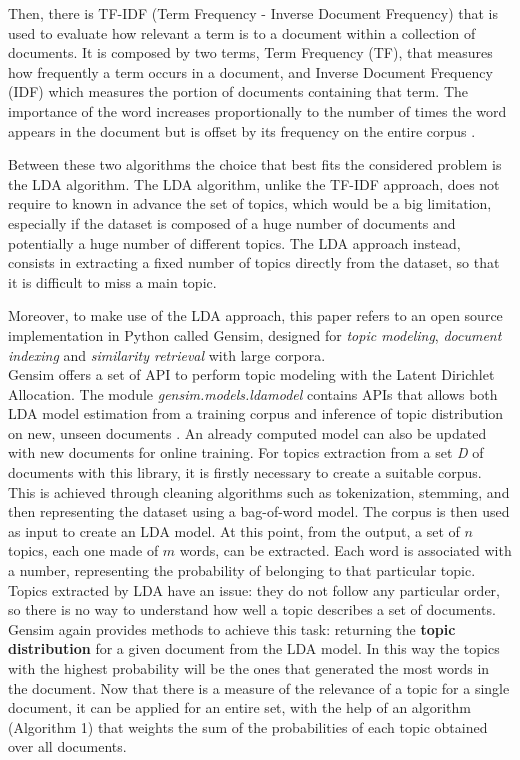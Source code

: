 Then, there is TF-IDF (Term Frequency - Inverse Document Frequency) that is used to evaluate how relevant a term is to a document within a collection of documents. It is composed by two terms, Term Frequency (TF), that measures how frequently a term occurs in a document, and Inverse Document Frequency (IDF) which measures the portion of documents containing that term. The importance of the word increases proportionally to the number of times the word appears in the document but is offset by its frequency on the entire corpus \cite{TFIDF}.



Between these two algorithms the choice that best fits the considered problem is the LDA algorithm. The LDA algorithm, unlike the TF-IDF approach, does not require to known in advance the set of topics, which would be a big limitation, especially if the dataset is composed of a huge number of documents and potentially a huge number of different topics. The LDA approach instead, consists in extracting a fixed number of topics directly from the dataset, so that it is difficult to miss a main topic.

Moreover, to make use of the LDA approach, this paper refers to an open source implementation in Python called Gensim, designed for \emph{topic modeling}, \emph{document indexing} and \emph{similarity retrieval} with large corpora.\\

Gensim offers a set of API to perform topic modeling with the Latent Dirichlet Allocation. The module \emph{gensim.models.ldamodel} contains APIs that allows both LDA model estimation from a training corpus and inference of topic distribution on new, unseen documents \cite{gensim}. An already computed model can also be updated with new documents for online training. For topics extraction from a set \emph{D} of documents with this library, it is firstly necessary to create a suitable corpus. This is achieved through cleaning algorithms such as tokenization, stemming, and then representing the dataset using a bag-of-word model. The corpus is then used as input to create an LDA model. At this point, from the output, a set of $n$ topics, each one made of $m$ words, can be extracted. Each word is associated with a number, representing the probability of belonging to that particular topic. Topics extracted by LDA have an issue: they do not follow any particular order, so there is no way to understand how well a topic describes a set of documents. Gensim again provides methods to achieve this task: returning the {\bfseries topic distribution} for a given document from the LDA model. In this way the topics with the highest probability will be the ones that generated the most words in the document. Now that there is a measure of the relevance of a topic for a single document, it can be applied for an entire set, with the help of an algorithm (Algorithm 1) that weights the sum of the probabilities of each topic obtained over all documents.

